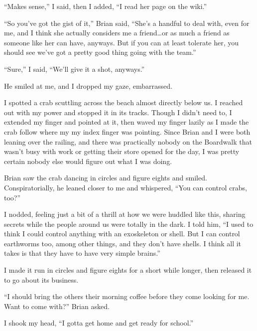 ``Makes sense,'' I said, then I added, ``I read her page on the wiki.''



``So you've got the gist of it,'' Brian said, ``She's a handful to deal with, even for me, and I think she actually considers me a friend\ldots or as much a friend as someone like her can have, anyways.  But if you can at least tolerate her, you should see we've got a pretty good thing going with the team.''



``Sure,'' I said, ``We'll give it a shot, anyways.''



He smiled at me, and I dropped my gaze, embarrassed.



I spotted a crab scuttling across the beach almost directly below us.  I reached out with my power and stopped it in its tracks.  Though I didn't need to, I extended my finger and pointed at it, then waved my finger lazily as I made the crab follow where my my index finger was pointing.  Since Brian and I were both leaning over the railing, and there was practically nobody on the Boardwalk that wasn't busy with work or getting their store opened for the day, I was pretty certain nobody else would figure out what I was doing.



Brian saw the crab dancing in circles and figure eights and smiled.  Conspiratorially, he leaned closer to me and whispered, ``You can control crabs, too?''



I nodded, feeling just a bit of a thrill at how we were huddled like this, sharing secrets while the people around us were totally in the dark.  I told him, ``I used to think I could control anything with an exoskeleton or shell.  But I can control earthworms too, among other things, and they don't have shells.  I think all it takes is that they have to have very simple brains.''



I made it run in circles and figure eights for a short while longer, then released it to go about its business.



``I should bring the others their morning coffee before they come looking for me.  Want to come with?'' Brian asked.



I shook my head, ``I gotta get home and get ready for school.''



